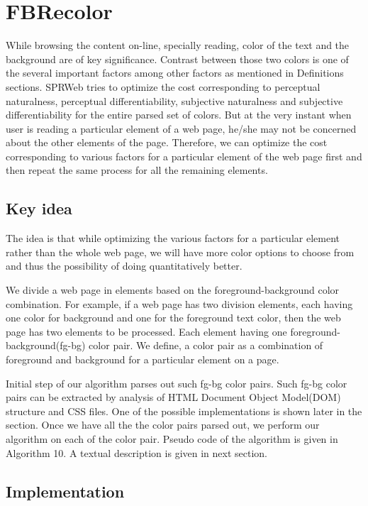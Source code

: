 \section{FBRecolor}
\label{FBRecolor}
While browsing the content on-line, specially reading, color of the text and the background are of key significance. Contrast between those two colors is one of the several important factors among other factors as mentioned in Definitions sections. SPRWeb tries to optimize the cost corresponding to perceptual naturalness, perceptual differentiability, subjective naturalness and subjective differentiability for the entire parsed set of colors. But at the very instant when user is reading a particular element of a web page, he/she may not be concerned about the other elements of the page. Therefore, we can optimize the cost corresponding to various factors for a particular element of the web page first and then repeat the same process for all the remaining elements. 


\subsection{Key idea} %
\label{Key idea}

The idea is that while optimizing the various factors for a particular element rather than the whole web page, we will have more color options to choose from and thus the possibility of doing quantitatively better.


We divide a web page in elements based on the foreground-background color combination. For example, if a web page has two division elements, each having one color for background and one for the foreground text color, then the web page has two elements to be processed. Each element having one foreground-background(fg-bg) color pair. We define, a color pair as a combination of foreground and background for a particular element on a page.

Initial step of our algorithm parses out such fg-bg color pairs. Such fg-bg color pairs can be extracted by analysis of HTML Document Object Model(DOM) structure and CSS files. One of the possible implementations is shown later in the section. Once we have all the the color pairs parsed out, we perform our algorithm on each of the color pair. Pseudo code of the algorithm is given in Algorithm 10. A textual description is given in next section.

\subsection{Implementation} %
\label{Implementation}

